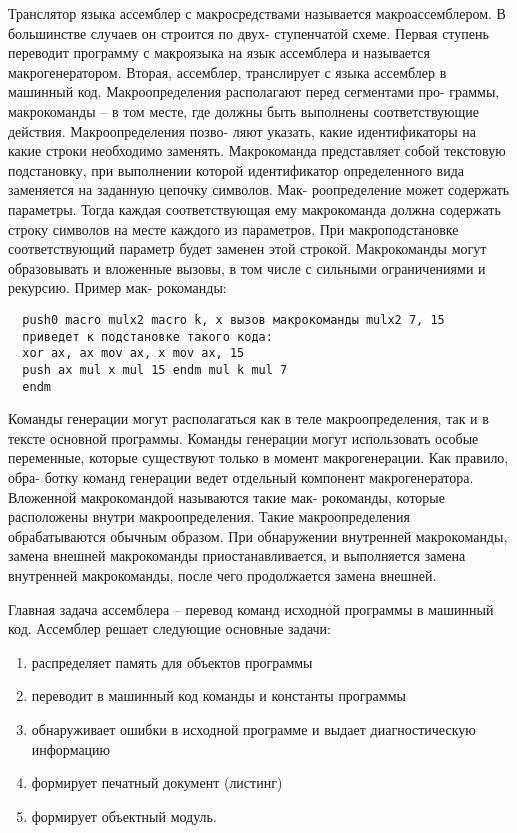 Транслятор языка ассемблер с макросредствами называется макроассемблером. В большинстве случаев он строится по двух- ступенчатой схеме. Первая ступень переводит программу с макроязыка на язык ассемблера и называется макрогенератором. Вторая, ассемблер, транслирует с языка ассемблер в машинный код. Макроопределения располагают перед сегментами про- граммы, макрокоманды – в том месте, где должны быть выполнены соответствующие действия. Макроопределения позво- ляют указать, какие идентификаторы на какие строки необходимо заменять. Макрокоманда представляет собой текстовую подстановку, при выполнении которой идентификатор определенного вида заменяется на заданную цепочку символов. Мак- роопределение может содержать параметры. Тогда каждая соответствующая ему макрокоманда должна содержать строку символов на месте каждого из параметров. При макроподстановке соответствующий параметр будет заменен этой строкой. Макрокоманды могут образовывать и вложенные вызовы, в том числе с сильными ограничениями и рекурсию. Пример мак- рокоманды:

\begin{verbatim}
  push0 macro mulx2 macro k, x вызов макрокоманды mulx2 7, 15 
  приведет к подстановке такого кода:
  xor ax, ax mov ax, x mov ax, 15 
  push ax mul x mul 15 endm mul k mul 7
  endm
\end{verbatim}

Команды генерации могут располагаться как в теле макроопределения, так и в тексте основной программы. Команды генерации могут использовать особые переменные, которые существуют только в момент макрогенерации. Как правило, обра- ботку команд генерации ведет отдельный компонент макрогенератора. Вложенной макрокомандой называются такие мак- рокоманды, которые расположены внутри макроопределения. Такие макроопределения обрабатываются обычным образом. При обнаружении внутренней макрокоманды, замена внешней макрокоманды приостанавливается, и выполняется замена внутренней макрокоманды, после чего продолжается замена внешней.

Главная задача ассемблера – перевод команд исходной программы в машинный код. Ассемблер решает следующие основные задачи:

\begin{enumerate}
  \item распределяет память для объектов программы
  \item переводит в машинный код команды и константы программы
  \item обнаруживает ошибки в исходной программе и выдает диагностическую информацию
  \item формирует печатный документ (листинг)
  \item формирует объектный модуль.
\end{enumerate}

